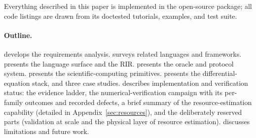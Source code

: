 Everything described in this paper is implemented in the open-source \pqlang{}
package; all code listings are drawn from its doctested tutorials, examples,
and test suite.

\paragraph{Outline.}   develops the requirements
analysis.   surveys related languages and frameworks.
 presents the language surface and the RIR.
 presents the oracle and protocol system.
 presents the scientific-computing primitives.
 presents the differential-equation stack, and
 three case studies.  
describes implementation and verification status: the evidence ladder, the
numerical-verification campaign with its per-family outcomes and recorded
defects, a brief summary of the resource-estimation capability (detailed in
Appendix~\ref{sec:resources}), and
the deliberately reserved parts (validation at scale and the physical layer
of resource estimation).   discusses limitations and future work.
